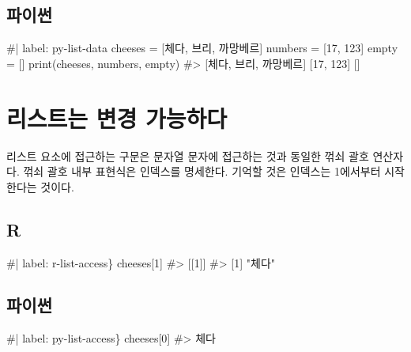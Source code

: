 \documentclass[
  letterpaper,
]{book}
\newenvironment{Shaded}{\begin{snugshade}}{\end{snugshade}}
\newcommand{\NormalTok}[1]{\textcolor[rgb]{0.00,0.23,0.31}{#1}}
\begin{document}
\subsection{파이썬}

\begin{Shaded}
\begin{Highlighting}[]
\NormalTok{\#| label: py{-}list{-}data}
\NormalTok{cheeses = [\textquotesingle{}체다\textquotesingle{}, \textquotesingle{}브리\textquotesingle{}, \textquotesingle{}까망베르\textquotesingle{}]}
\NormalTok{numbers = [17, 123]}
\NormalTok{empty = []}
\NormalTok{print(cheeses, numbers, empty)}
\NormalTok{\#\textgreater{} [\textquotesingle{}체다\textquotesingle{}, \textquotesingle{}브리\textquotesingle{}, \textquotesingle{}까망베르\textquotesingle{}] [17, 123] []}
\end{Highlighting}
\end{Shaded}


\section{리스트는 변경 가능하다}\label{r-list-mutable}

   

리스트 요소에 접근하는 구문은 문자열 문자에 접근하는 것과 동일한 꺾쇠
괄호 연산자다. 꺾쇠 괄호 내부 표현식은 인덱스를 명세한다. 기억할 것은
인덱스는 1에서부터 시작한다는 것이다.

\subsection{R}

\begin{Shaded}
\begin{Highlighting}[]
\NormalTok{\#| label: r{-}list{-}access\}}
\NormalTok{cheeses[1]}
\NormalTok{\#\textgreater{} [[1]]}
\NormalTok{\#\textgreater{} [1] "체다"}
\end{Highlighting}
\end{Shaded}

\subsection{파이썬}

\begin{Shaded}
\begin{Highlighting}[]
\NormalTok{\#| label: py{-}list{-}access\}}
\NormalTok{cheeses[0]}
\NormalTok{\#\textgreater{} \textquotesingle{}체다\textquotesingle{}}
\end{Highlighting}
\end{Shaded}
\end{document}
